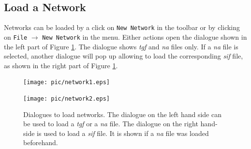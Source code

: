 \subsection{Load a Network}
\label{subsection:loadNetworks}
Networks can be loaded by a click on \texttt{New Network} in the toolbar or by clicking on \texttt{File} $\rightarrow$ \texttt{New Network} in the menu.
Either actions open the dialogue shown in the left part of Figure \ref{figure:loadNetwork1}. The dialogue shows \textit{tgf} and \textit{na} files only. 
If a \textit{na} file is selected, another dialogue will pop up allowing to load the corresponding \textit{sif} file, as shown in the right part of Figure \ref{figure:loadNetwork1}.
\begin{figure}[H]
\begin{minipage}{6cm}
 \texttt{[image: pic/network1.eps]}
\end{minipage}
%
\begin{minipage}{6cm}
 \texttt{[image: pic/network2.eps]}
\end{minipage}
\caption{Dialogues to load networks. The dialogue on the left hand side can be used to load a \textit{tgf} or a \textit{na} file. The dialogue on the right hand-side is used to load a \textit{sif} file. It is shown if
a \textit{na} file was loaded beforehand.}
\label{figure:loadNetwork1}
\end{figure}

